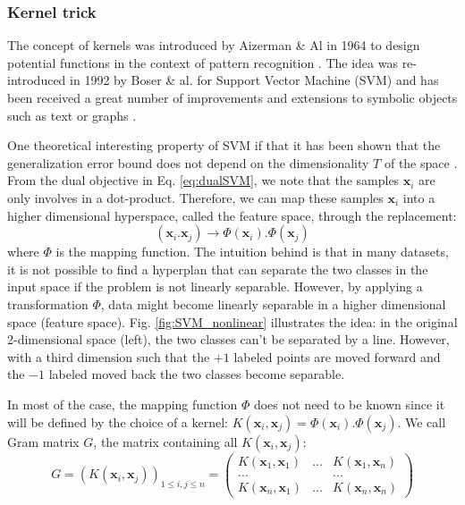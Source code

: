 \subsubsection{Kernel trick}
The concept of kernels was introduced by Aizerman \& Al in 1964 to design potential functions in the context of pattern recognition \cite{Aizerman1964}. The idea was re-introduced in 1992 by Boser \& al. for Support Vector Machine (SVM) and has been received a great number of improvements and extensions to symbolic objects such as text or graphs \cite{Boser1992}.

One theoretical interesting property of SVM if that it has been shown that the generalization error bound does not depend on the dimensionality $T$ of the space \cite{Schlkopf2013}. From the dual objective in Eq. \ref{eq:dualSVM}, we note that the samples $\textbf{x}_i$ are only involves in a dot-product. Therefore, we can map these samples $\textbf{x}_i$ into a higher dimensional hyperspace, called the feature space, through the replacement:
\begin{equation}
	(\textbf{x}_i . \textbf{x}_j) \rightarrow \Phi(\textbf{x}_i) . \Phi(\textbf{x}_j) 
\end{equation}
\noindent where $\Phi$ is the mapping function. The intuition behind is that in many datasets, it is not possible to find a hyperplan that can separate the two classes in the input space if the problem is not linearly separable. However, by applying a transformation $\Phi$, data might become linearly separable in a higher dimensional space (feature space). Fig. \ref{fig:SVM_nonlinear} illustrates the idea: in the original 2-dimensional space (left), the two classes can't be separated by a line. However, with a third dimension such that the $+1$ labeled points are moved forward and the $-1$ labeled moved back the two classes become separable.

In most of the case, the mapping function $\Phi$ does not need to be known since it will be defined by the choice of a kernel: $K(\textbf{x}_i,\textbf{x}_j)= \Phi(\textbf{x}_i) . \Phi(\textbf{x}_j)$. We call Gram matrix $G$, the matrix containing all $K(\textbf{x}_i,\textbf{x}_j)$:
\begin{equation*}
	G = (K(\textbf{x}_i,\textbf{x}_j))_{1 \leq i,j \leq n} = 
	\begin{pmatrix}
	K(\textbf{x}_1,\textbf{x}_1) & ... & K(\textbf{x}_1,\textbf{x}_n) \\
	... & & ... \\
	K(\textbf{x}_n,\textbf{x}_1) & ... & K(\textbf{x}_n,\textbf{x}_n) 
	\end{pmatrix}
\end{equation*}

